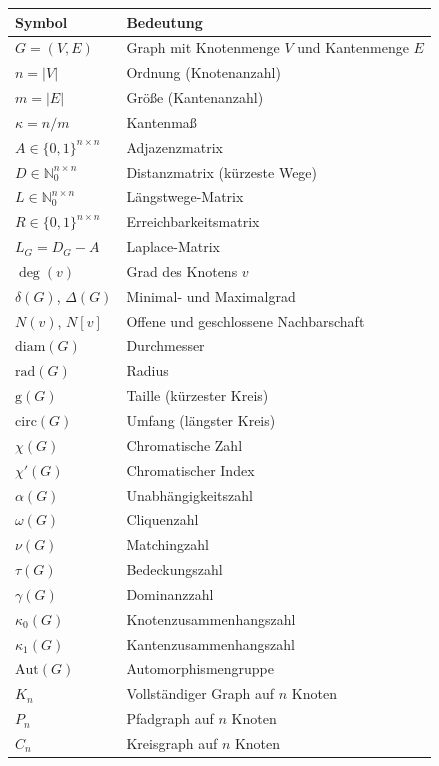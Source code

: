 ﻿\documentclass[a4paper,12pt,openany,oneside]{book}
\theoremstyle{definition}
\theoremstyle{plain}
\theoremstyle{remark}
\begin{document}
\begin{tabular}{@{}lp{9.5cm}@{}}
  \toprule
  \textbf{Symbol} & \textbf{Bedeutung} \\
  \midrule
  $G = (V,E)$ & Graph mit Knotenmenge $V$ und Kantenmenge $E$ \\
  $n = |V|$ & Ordnung (Knotenanzahl) \\
  $m = |E|$ & Gr\"o\ss{}e (Kantenanzahl) \\
  $\kappa = n/m$ & Kantenma\ss{} \\
  $A \in \{0,1\}^{n \times n}$ & Adjazenzmatrix \\
  $D \in \mathbb{N}_0^{n \times n}$ & Distanzmatrix (k\"urzeste Wege) \\
  $L \in \mathbb{N}_0^{n \times n}$ & L\"angstwege-Matrix \\
  $R \in \{0,1\}^{n \times n}$ & Erreichbarkeitsmatrix \\
  $L_G = D_G - A$ & Laplace-Matrix \\
  $\deg(v)$ & Grad des Knotens $v$ \\
  $\delta(G)$, $\Delta(G)$ & Minimal- und Maximalgrad \\
  $N(v)$, $N[v]$ & Offene und geschlossene Nachbarschaft \\
  $\mathrm{diam}(G)$ & Durchmesser \\
  $\mathrm{rad}(G)$ & Radius \\
  $\mathrm{g}(G)$ & Taille (k\"urzester Kreis) \\
  $\mathrm{circ}(G)$ & Umfang (l\"angster Kreis) \\
  $\chi(G)$ & Chromatische Zahl \\
  $\chi'(G)$ & Chromatischer Index \\
  $\alpha(G)$ & Unabh\"angigkeitszahl \\
  $\omega(G)$ & Cliquenzahl \\
  $\nu(G)$ & Matchingzahl \\
  $\tau(G)$ & Bedeckungszahl \\
  $\gamma(G)$ & Dominanzzahl \\
  $\kappa_0(G)$ & Knotenzusammenhangszahl \\
  $\kappa_1(G)$ & Kantenzusammenhangszahl \\
  $\mathrm{Aut}(G)$ & Automorphismengruppe \\
  $K_n$ & Vollst\"andiger Graph auf $n$ Knoten \\
  $P_n$ & Pfadgraph auf $n$ Knoten \\
  $C_n$ & Kreisgraph auf $n$ Knoten \\

\end{tabular}
\end{document}
